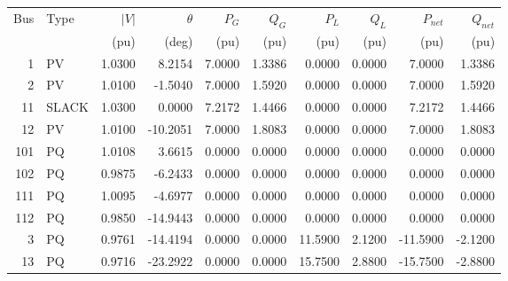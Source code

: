 \begin{tabular}{rlrrrrrrrr}\toprule
{Bus} & {Type} & {$|V|$} & {$\theta$} & {$P_G$} & {$Q_G$} & {$P_L$} & {$Q_L$} & {$P_{net}$} & {$Q_{net}$}\\
{} & {} & {(pu)} & {(deg)} & {(pu)} & {(pu)} & {(pu)} & {(pu)} & {(pu)} & {(pu)}\\ \midrule
1 & PV & 1.0300 & 8.2154 & 7.0000 & 1.3386 & 0.0000 & 0.0000 & 7.0000 & 1.3386\\
2 & PV & 1.0100 & -1.5040 & 7.0000 & 1.5920 & 0.0000 & 0.0000 & 7.0000 & 1.5920\\
11 & SLACK & 1.0300 & 0.0000 & 7.2172 & 1.4466 & 0.0000 & 0.0000 & 7.2172 & 1.4466\\
12 & PV & 1.0100 & -10.2051 & 7.0000 & 1.8083 & 0.0000 & 0.0000 & 7.0000 & 1.8083\\
101 & PQ & 1.0108 & 3.6615 & 0.0000 & 0.0000 & 0.0000 & 0.0000 & 0.0000 & 0.0000\\
102 & PQ & 0.9875 & -6.2433 & 0.0000 & 0.0000 & 0.0000 & 0.0000 & 0.0000 & 0.0000\\
111 & PQ & 1.0095 & -4.6977 & 0.0000 & 0.0000 & 0.0000 & 0.0000 & 0.0000 & 0.0000\\
112 & PQ & 0.9850 & -14.9443 & 0.0000 & 0.0000 & 0.0000 & 0.0000 & 0.0000 & 0.0000\\
3 & PQ & 0.9761 & -14.4194 & 0.0000 & 0.0000 & 11.5900 & 2.1200 & -11.5900 & -2.1200\\
13 & PQ & 0.9716 & -23.2922 & 0.0000 & 0.0000 & 15.7500 & 2.8800 & -15.7500 & -2.8800\\
\bottomrule\end{tabular}
